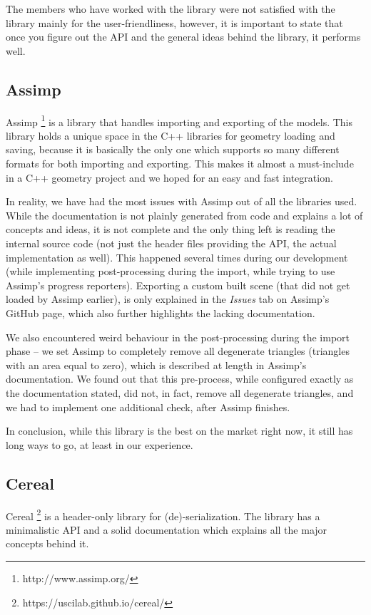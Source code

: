 The members who have worked with the library were not satisfied with the library mainly for the user-friendliness, however, it is important to state that once you figure out the API and the general ideas behind the library, it performs well.

\subsection{Assimp}

Assimp \footnote{http://www.assimp.org/} is a library that handles importing and exporting of the models. This library holds a unique space in the C++ libraries for geometry loading and saving, because it is basically the only one which supports so many different formats for both importing and exporting. This makes it almost a must-include in a C++ geometry project and we hoped for an easy and fast integration.

In reality, we have had the most issues with Assimp out of all the libraries used. While the documentation is not plainly generated from code and explains a lot of concepts and ideas, it is not complete and the only thing left is reading the internal source code (not just the header files providing the API, the actual implementation as well). This happened several times during our development (while implementing post-processing during the import, while trying to use Assimp's progress reporters). Exporting a custom built scene (that did not get loaded by Assimp earlier), is only explained in the \textit{Issues} tab on Assimp's GitHub page, which also further highlights the lacking documentation.

We also encountered weird behaviour in the post-processing during the import phase -- we set Assimp to completely remove all degenerate triangles (triangles with an area equal to zero), which is described at length in Assimp's documentation. We found out that this pre-process, while configured exactly as the documentation stated, did not, in fact, remove all degenerate triangles, and we had to implement one additional check, after Assimp finishes.

In conclusion, while this library is the best on the market right now, it still has long ways to go, at least in our experience.

\subsection{Cereal}

Cereal \footnote{https://uscilab.github.io/cereal/} is a header-only library for (de)-serialization. The library has a minimalistic API and a solid documentation which explains all the major concepts behind it.

